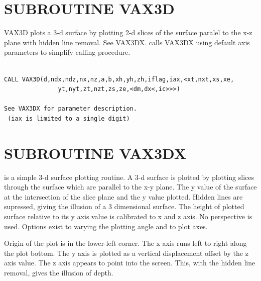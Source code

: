 \documentclass[11pt]{report}
\begin{document}
\newpage
\section{SUBROUTINE VAX3D}

VAX3D plots a 3-d surface by plotting 2-d slices of the surface paralel
to the x-z plane with hidden line removal.  See VAX3DX.
 calls VAX3DX using default axis parameters to simplify calling
procedure.
\begin{verbatim}

CALL VAX3D(d,ndx,ndz,nx,nz,a,b,xh,yh,zh,iflag,iax,<xt,nxt,xs,xe,
               yt,nyt,zt,nzt,zs,ze,<dm,dx<,ic>>>)

See VAX3DX for parameter description.
 (iax is limited to a single digit)
\end{verbatim}

\section{SUBROUTINE VAX3DX}

 is a simple 3-d surface plotting routine.  A 3-d surface is
plotted by plotting slices through the surface which are parallel to
the x-y plane.  The y value of the surface at the intersection
of the slice plane and the y value plotted.  Hidden lines are supressed,
giving the illusion of a 3 dimensional surface.  The height of plotted
surface relative to its y axis value is calibrated to x and z axis.  No
perspective is used.  Options exist to varying the plotting angle and 
to plot axes.

Origin of the plot is in the lower-left corner.  The x axis runs
left to right along the plot bottom.  The y axis is plotted
as a vertical displacement offset by the z axis value.  The z axis appears
to point into the screen.  This, with the hidden line removal, gives the
illusion of depth.
\end{document}
